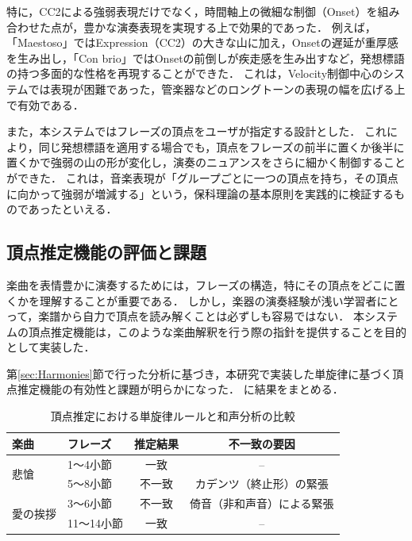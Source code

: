 特に，CC2による強弱表現だけでなく，時間軸上の微細な制御（Onset）を組み合わせた点が，豊かな演奏表現を実現する上で効果的であった．
例えば，「Maestoso」ではExpression（CC2）の大きな山に加え，Onsetの遅延が重厚感を生み出し，「Con brio」ではOnsetの前倒しが疾走感を生み出すなど，発想標語の持つ多面的な性格を再現することができた．
これは，Velocity制御中心のシステムでは表現が困難であった，管楽器などのロングトーンの表現の幅を広げる上で有効である．

また，本システムではフレーズの頂点をユーザが指定する設計とした．
これにより，同じ発想標語を適用する場合でも，頂点をフレーズの前半に置くか後半に置くかで強弱の山の形が変化し，演奏のニュアンスをさらに細かく制御することができた．
これは，音楽表現が「グループごとに一つの頂点を持ち，その頂点に向かって強弱が増減する」という，保科理論の基本原則を実践的に検証するものであったといえる．

\subsection{頂点推定機能の評価と課題} \label{sec:ApexIssue}
楽曲を表情豊かに演奏するためには，フレーズの構造，特にその頂点をどこに置くかを理解することが重要である．
しかし，楽器の演奏経験が浅い学習者にとって，楽譜から自力で頂点を読み解くことは必ずしも容易ではない．
本システムの頂点推定機能は，このような楽曲解釈を行う際の指針を提供することを目的として実装した．

第\ref{sec:Harmonies}節で行った分析に基づき，本研究で実装した単旋律に基づく頂点推定機能の有効性と課題が明らかになった．
に結果をまとめる．

\begin{table}[tb]
	\centering
	\fontsize{7pt}{10pt}\selectfont
	\caption{頂点推定における単旋律ルールと和声分析の比較}
	\label{tab:apex_summary}
	\begin{tabular}{l|l|c|c} \hline
		\textbf{楽曲}           & \textbf{フレーズ} & \textbf{推定結果} & \textbf{不一致の要因} \\ \hline \hline
		\multirow{2}{*}{悲愴}   & 1～4小節         & 一致            & --              \\ \cline{2-4}
		                      & 5～8小節         & 不一致           & カデンツ（終止形）の緊張    \\ \hline
		\multirow{2}{*}{愛の挨拶} & 3～6小節         & 不一致           & 倚音（非和声音）による緊張   \\ \cline{2-4}
		                      & 11～14小節       & 一致            & --              \\ \hline
	\end{tabular}
\end{table}

